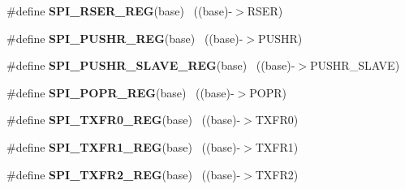 \begin{DoxyCompactItemize}
\item 
\hypertarget{group___s_p_i___register___accessor___macros_ga9f132bbe51ac921e48eb67afd580ed34}{}\#define {\bfseries S\+P\+I\+\_\+\+R\+S\+E\+R\+\_\+\+R\+E\+G}(base)                                          ~((base)-\/$>$R\+S\+E\+R)\label{group___s_p_i___register___accessor___macros_ga9f132bbe51ac921e48eb67afd580ed34}

\item 
\hypertarget{group___s_p_i___register___accessor___macros_gacca7ae364ed1cf69ce3a13c76691ce63}{}\#define {\bfseries S\+P\+I\+\_\+\+P\+U\+S\+H\+R\+\_\+\+R\+E\+G}(base)                                        ~((base)-\/$>$P\+U\+S\+H\+R)\label{group___s_p_i___register___accessor___macros_gacca7ae364ed1cf69ce3a13c76691ce63}

\item 
\hypertarget{group___s_p_i___register___accessor___macros_gab2be31eae2e6d72caaac8897ed48099f}{}\#define {\bfseries S\+P\+I\+\_\+\+P\+U\+S\+H\+R\+\_\+\+S\+L\+A\+V\+E\+\_\+\+R\+E\+G}(base)                            ~((base)-\/$>$P\+U\+S\+H\+R\+\_\+\+S\+L\+A\+V\+E)\label{group___s_p_i___register___accessor___macros_gab2be31eae2e6d72caaac8897ed48099f}

\item 
\hypertarget{group___s_p_i___register___accessor___macros_ga57ef11c450e1a45e272be2849083977b}{}\#define {\bfseries S\+P\+I\+\_\+\+P\+O\+P\+R\+\_\+\+R\+E\+G}(base)                                          ~((base)-\/$>$P\+O\+P\+R)\label{group___s_p_i___register___accessor___macros_ga57ef11c450e1a45e272be2849083977b}

\item 
\hypertarget{group___s_p_i___register___accessor___macros_ga71b7e1c40b7f2d11e956b9814be20261}{}\#define {\bfseries S\+P\+I\+\_\+\+T\+X\+F\+R0\+\_\+\+R\+E\+G}(base)                                        ~((base)-\/$>$T\+X\+F\+R0)\label{group___s_p_i___register___accessor___macros_ga71b7e1c40b7f2d11e956b9814be20261}

\item 
\hypertarget{group___s_p_i___register___accessor___macros_ga9011fe0adbd2dce8076c23bbe8aef929}{}\#define {\bfseries S\+P\+I\+\_\+\+T\+X\+F\+R1\+\_\+\+R\+E\+G}(base)                                        ~((base)-\/$>$T\+X\+F\+R1)\label{group___s_p_i___register___accessor___macros_ga9011fe0adbd2dce8076c23bbe8aef929}

\item 
\hypertarget{group___s_p_i___register___accessor___macros_ga54c1e67e69fb1a8b1baef7a520df5e39}{}\#define {\bfseries S\+P\+I\+\_\+\+T\+X\+F\+R2\+\_\+\+R\+E\+G}(base)                                        ~((base)-\/$>$T\+X\+F\+R2)\label{group___s_p_i___register___accessor___macros_ga54c1e67e69fb1a8b1baef7a520df5e39}


\end{DoxyCompactItemize}
